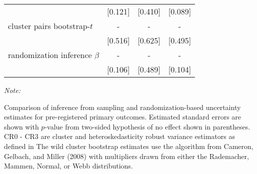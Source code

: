 \begin{table}[H]
\begin{threeparttable}
\begin{tabular}{lccc}
 & [0.121] & [0.410] & [0.089]\\
\addlinespace
cluster pairs bootstrap-$t$ & - & - & -\\
 & [0.516] & [0.625] & [0.495]\\
\addlinespace
randomization inference $\beta$ & - & - & -\\
 & [0.106] & [0.489] & [0.104]\\
\bottomrule
\end{tabular}
\begin{tablenotes}
\item \textit{Note: } 
\item Comparison of inference from sampling and randomization-based
       uncertainty estimates for pre-registered primary outcomes. Estimated standard errors
       are shown with $p$-value from two-sided hypothesis of no effect shown in parentheses.
       CR0 - CR3 are cluster and heteroskedasticity robust variance estimators as defined in
       The wild cluster bootstrap estimates use the algorithm from Cameron, Gelbach, and Miller (2008)
       with multipliers drawn from either the Rademacher, Mammen, Normal, or Webb distributions.
\end{tablenotes}
\end{threeparttable}
\end{table}
